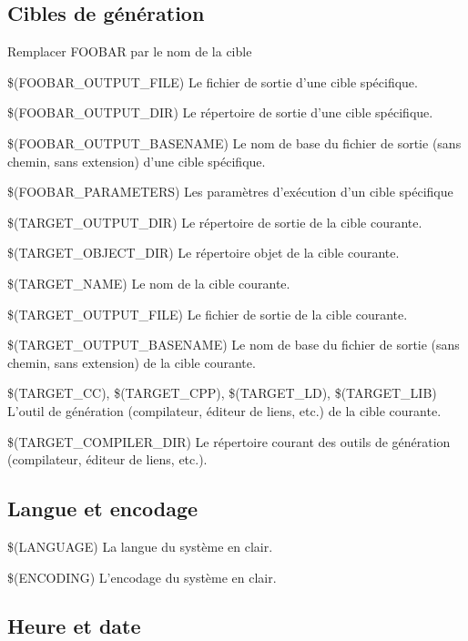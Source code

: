 \subsection{Cibles de génération}

Remplacer FOOBAR par le nom de la cible 

\begin{codeentry}
\item[\$(FOOBAR\_OUTPUT\_FILE)] Le fichier de sortie d'une cible spécifique.
\item[\$(FOOBAR\_OUTPUT\_DIR)] Le répertoire de sortie d'une cible spécifique.
\item[\$(FOOBAR\_OUTPUT\_BASENAME)] Le nom de base du fichier de sortie (sans chemin, sans extension) d'une cible spécifique.
\item[\$(FOOBAR\_PARAMETERS)] Les paramètres d'exécution d'un cible spécifique
\item[\$(TARGET\_OUTPUT\_DIR)] Le répertoire de sortie de la cible courante.
\item[\$(TARGET\_OBJECT\_DIR)] Le répertoire objet de la cible courante.
\item[\$(TARGET\_NAME)] Le nom de la cible courante.
\item[\$(TARGET\_OUTPUT\_FILE)] Le fichier de sortie de la cible courante.
\item[\$(TARGET\_OUTPUT\_BASENAME)] Le nom de base du fichier de sortie (sans chemin, sans extension) de la cible courante.
\item[\$(TARGET\_CC), \$(TARGET\_CPP), \$(TARGET\_LD), \$(TARGET\_LIB)] L'outil de génération (compilateur, éditeur de liens, etc.) de la cible courante.
\item[\$(TARGET\_COMPILER\_DIR)] Le répertoire courant des outils de génération (compilateur, éditeur de liens, etc.).
\end{codeentry}

\subsection{Langue et encodage}

\begin{codeentry}
\item[\$(LANGUAGE)] La langue du système en clair.
\item[\$(ENCODING)] L'encodage du système en clair.
\end{codeentry}

\subsection{Heure et date}

